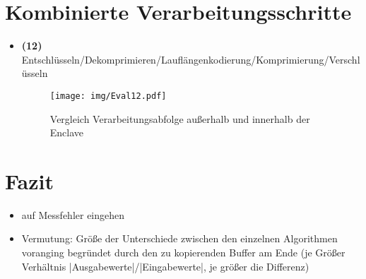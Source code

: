 \section{Kombinierte Verarbeitungsschritte}

\begin{itemize}
	\item \textbf{(12)} Entschlüsseln/Dekomprimieren/Lauflängenkodierung/Komprimierung/Verschlüsseln
	\begin{figure}[h]
		\texttt{[image: img/Eval12.pdf]}
		\centering
		\caption{Vergleich Verarbeitungsabfolge außerhalb und innerhalb der Enclave}
		\label{fig:eval13}
	\end{figure}

\end{itemize}

\section{Fazit}

\begin{itemize}
	\item auf Messfehler eingehen
	\item Vermutung: Größe der Unterschiede zwischen den einzelnen Algorithmen voranging begründet durch den zu kopierenden Buffer am Ende (je Größer Verhältnis |Ausgabewerte|/|Eingabewerte|, je größer die Differenz)
\end{itemize}